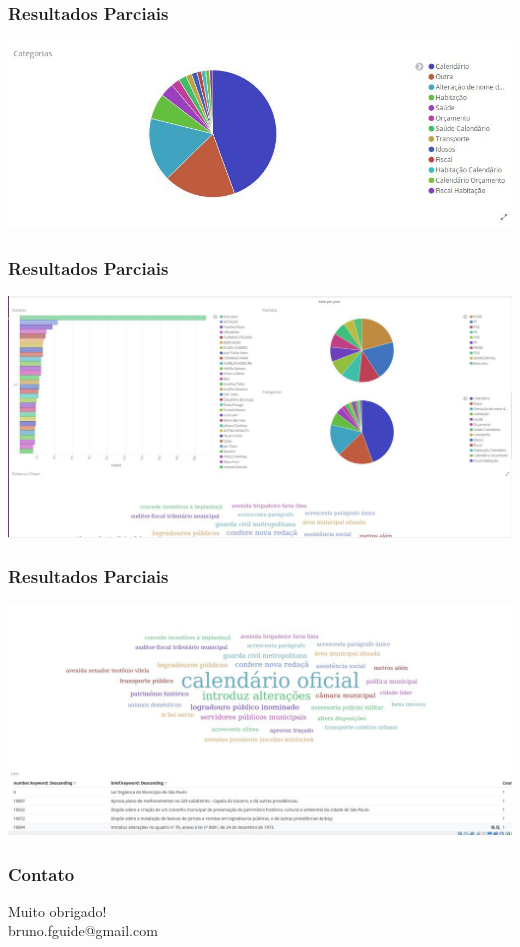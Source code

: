 \documentclass[11pt]{beamer}
\begin{document}
\begin{frame}
\frametitle{Resultados Parciais}
\includegraphics[width=\columnwidth,height=\textheight,keepaspectratio]{CipoalCat.jpg}

\end{frame}
\begin{frame}
\frametitle{Resultados Parciais}
\includegraphics[width=\columnwidth,height=\textheight,keepaspectratio]{Cipoal3.jpg}

\end{frame}
\begin{frame}
\frametitle{Resultados Parciais}
\includegraphics[width=\columnwidth,height=\textheight,keepaspectratio]{Cipoal4.jpg}

\end{frame}
\begin{frame}
\frametitle{Contato}
\begin{center}
	Muito obrigado!\\
	bruno.fguide@gmail.com
\end{center}
\end{frame}
\end{document}
